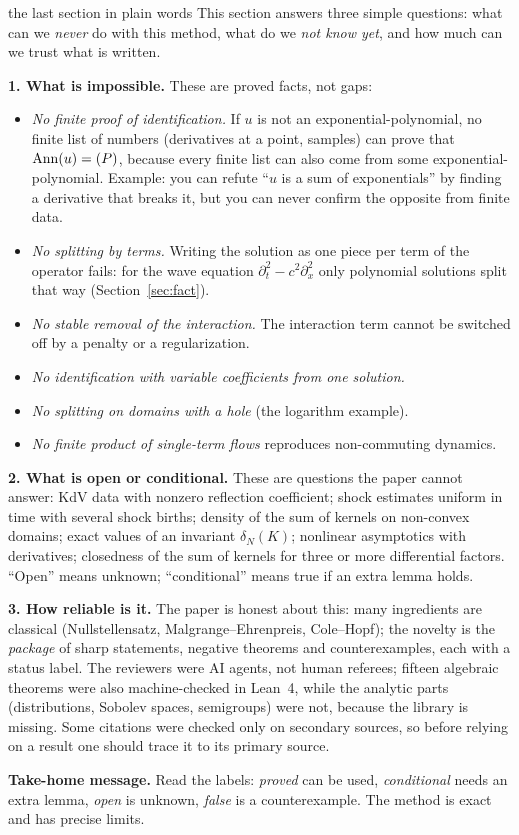 \begin{explained}{the last section in plain words}
This section answers three simple questions: what can we \emph{never} do with this method, what do we \emph{not know yet}, and how much can we trust what is written.

\medskip\textbf{1. What is impossible.} These are proved facts, not gaps:
\begin{itemize}[nosep]
\item \emph{No finite proof of identification.} If $u$ is not an exponential-polynomial, no finite list of numbers (derivatives at a point, samples) can prove that $\operatorname{Ann}(u)=(P)$, because every finite list can also come from some exponential-polynomial. Example: you can refute ``$u$ is a sum of exponentials'' by finding a derivative that breaks it, but you can never confirm the opposite from finite data.
\item \emph{No splitting by terms.} Writing the solution as one piece per term of the operator fails: for the wave equation $\partial_t^2-c^2\partial_x^2$ only polynomial solutions split that way (Section~\ref{sec:fact}).
\item \emph{No stable removal of the interaction.} The interaction term cannot be switched off by a penalty or a regularization.
\item \emph{No identification with variable coefficients from one solution.}
\item \emph{No splitting on domains with a hole} (the logarithm example).
\item \emph{No finite product of single-term flows} reproduces non-commuting dynamics.
\end{itemize}

\medskip\textbf{2. What is open or conditional.} These are questions the paper cannot answer: KdV data with nonzero reflection coefficient; shock estimates uniform in time with several shock births; density of the sum of kernels on non-convex domains; exact values of an invariant $\delta_N(K)$; nonlinear asymptotics with derivatives; closedness of the sum of kernels for three or more differential factors. ``Open'' means unknown; ``conditional'' means true if an extra lemma holds.

\medskip\textbf{3. How reliable is it.} The paper is honest about this: many ingredients are classical (Nullstellensatz, Malgrange--Ehrenpreis, Cole--Hopf); the novelty is the \emph{package} of sharp statements, negative theorems and counterexamples, each with a status label. The reviewers were AI agents, not human referees; fifteen algebraic theorems were also machine-checked in Lean~4, while the analytic parts (distributions, Sobolev spaces, semigroups) were not, because the library is missing. Some citations were checked only on secondary sources, so before relying on a result one should trace it to its primary source.

\medskip\textbf{Take-home message.} Read the labels: \emph{proved} can be used, \emph{conditional} needs an extra lemma, \emph{open} is unknown, \emph{false} is a counterexample. The method is exact and has precise limits.
\end{explained}
